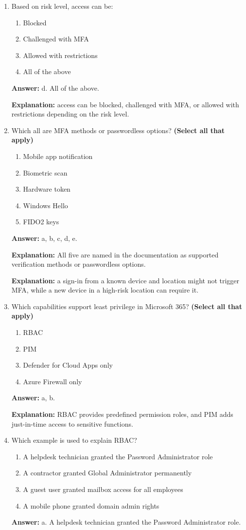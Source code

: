 \documentclass[10pt]{article}
\begin{document}
\begin{enumerate}[leftmargin=*]
\item Based on risk level, access can be:
\begin{enumerate}[label=\alph*., leftmargin=1.5em]
\item Blocked
\item Challenged with MFA
\item Allowed with restrictions
\item All of the above
\end{enumerate}
\textbf{Answer:} d. All of the above.

\textbf{Explanation:} access can be blocked, challenged with MFA, or allowed with restrictions depending on the risk level.

\item Which all are MFA methods or passwordless options? \textbf{(Select all that apply)}
\begin{enumerate}[label=\alph*., leftmargin=1.5em]
\item Mobile app notification
\item Biometric scan
\item Hardware token
\item Windows Hello
\item FIDO2 keys
\end{enumerate}
\textbf{Answer:} a, b, c, d, e.

\textbf{Explanation:} All five are named in the documentation as supported verification methods or passwordless options.

\textbf{Explanation:} a sign-in from a known device and location might not trigger MFA, while a new device in a high-risk location can require it.

\item Which capabilities support least privilege in Microsoft 365? \textbf{(Select all that apply)}
\begin{enumerate}[label=\alph*., leftmargin=1.5em]
\item RBAC
\item PIM
\item Defender for Cloud Apps only
\item Azure Firewall only
\end{enumerate}
\textbf{Answer:} a, b.

\textbf{Explanation:} RBAC provides predefined permission roles, and PIM adds just-in-time access to sensitive functions.

\item Which example is used to explain RBAC?
\begin{enumerate}[label=\alph*., leftmargin=1.5em]
\item A helpdesk technician granted the Password Administrator role
\item A contractor granted Global Administrator permanently
\item A guest user granted mailbox access for all employees
\item A mobile phone granted domain admin rights
\end{enumerate}
\textbf{Answer:} a. A helpdesk technician granted the Password Administrator role.


\end{enumerate}
\end{document}
